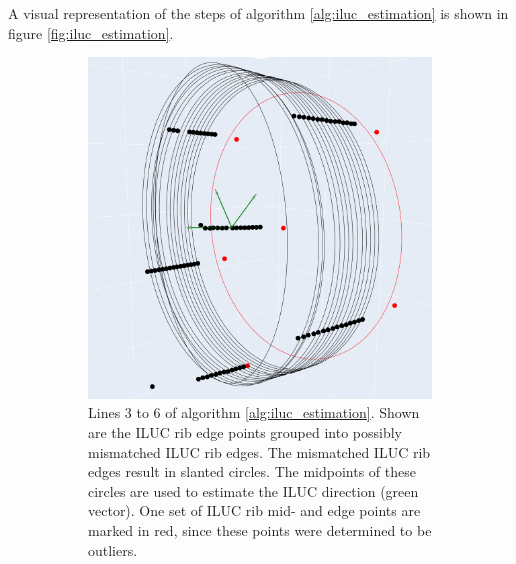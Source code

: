A visual representation of the steps of algorithm \ref{alg:iluc_estimation} is shown in figure \ref{fig:iluc_estimation}.
\begin{figure}[H]
    \centering
    \begin{subfigure}[c]{0.45\textwidth}
        \includegraphics[width=\textwidth]{images/ILUC_naive_grouping.png}
        \caption{Lines 3 to 6 of algorithm \ref{alg:iluc_estimation}. Shown are the ILUC rib edge points grouped into possibly mismatched ILUC rib edges. The mismatched ILUC rib edges result in slanted circles. The midpoints of these circles are used to estimate the ILUC direction (green vector). One set of ILUC rib mid- and edge points are marked in red, since these points were determined to be outliers.}
        \label{fig:iluc_mismatched_edges}
    \end{subfigure}
    \begin{subfigure}[c]{0.45\textwidth}

\end{subfigure}
\end{figure}
